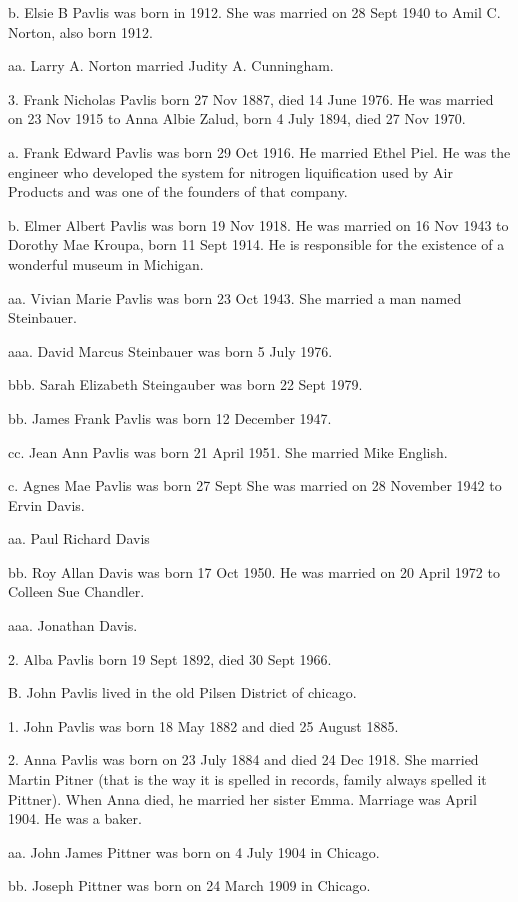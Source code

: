 \documentclass[a4paper]{article}
\begin{document}
b. Elsie B Pavlis was born in 1912.  She was married on 28 Sept 1940 to Amil C. Norton, also born 1912. 

aa. Larry A. Norton married Judity A. Cunningham.  

3. Frank Nicholas Pavlis born 27 Nov 1887, died 14 June 1976.  He was married on 23 Nov 1915 to Anna Albie Zalud, born 4 July 1894, died 27 Nov 1970.  

a. Frank Edward Pavlis was born 29 Oct 1916.  He married Ethel Piel. He was the engineer who developed the system for nitrogen liquification used by Air Products and was one of the founders of that company.

b. Elmer Albert Pavlis was born 19 Nov 1918.  He was married on 16 Nov 1943 to Dorothy Mae Kroupa, born 11 Sept 1914.  He is responsible for the existence of a wonderful museum in Michigan.

aa. Vivian Marie Pavlis was born 23 Oct 1943.  She married a man named Steinbauer.

aaa. David Marcus Steinbauer was born 5 July 1976.

bbb. Sarah Elizabeth Steingauber was born 22 Sept 1979.

bb. James Frank Pavlis was born 12 December 1947.

cc. Jean Ann Pavlis was born 21 April 1951.  She married Mike English.  

c. Agnes Mae Pavlis was born 27 Sept She was married on 28 November 1942 to Ervin Davis.  

aa.  Paul Richard Davis

bb. Roy Allan Davis was born 17 Oct 1950.  He was married on 20 April 1972 to Colleen Sue Chandler.  

aaa. Jonathan Davis. 

2. Alba Pavlis born 19 Sept 1892, died 30 Sept 1966.    

B. John Pavlis lived in the old Pilsen District of chicago.  

1. John Pavlis was born 18 May 1882 and died 25 August 1885.

2. Anna Pavlis was born on 23 July 1884 and died 24 Dec 1918.  She married Martin Pitner (that is the way it is spelled in records, family always spelled it Pittner).  When Anna died, he married her sister Emma.  Marriage was April 1904.  He was a baker.  

aa. John James Pittner was born on 4 July 1904 in Chicago.

bb. Joseph Pittner was born on 24 March 1909 in Chicago.
\end{document}
